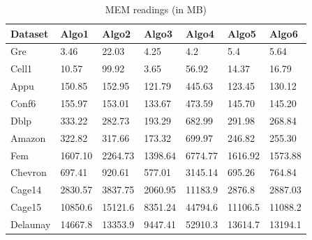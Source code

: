 

\begin{table}[th]
\begin{center}
    \begin{tabular}{| l | l | l | l | l | l | l |}
    \hline
	Dataset & Algo1 & Algo2 & Algo3 & Algo4 & Algo5 & Algo6\\ \hline
    \hline
	Gre & \cellcolor{blue!25}3.46 & 22.03 & 4.25 & 4.2 & 5.4 & 5.64 \\ \hline
	Cell1 & 10.57 & 99.92 & \cellcolor{blue!25}3.65 & 56.92 & 14.37 & 16.79\\ \hline
	Appu & 150.85 & 152.95 & \cellcolor{blue!25}121.79 & 445.63 & 123.45 & 130.12\\ \hline
	Conf6 & 155.97 & 153.01 & \cellcolor{blue!25}133.67 & 473.59 & 145.70 & 145.20\\ \hline
	Dblp & 333.22 & 282.73 & \cellcolor{blue!25}193.29 & 682.99 & 291.98 & 268.84\\ \hline
	Amazon & 322.82 & 317.66 & \cellcolor{blue!25}173.32 & 699.97 & 246.82 & 255.30\\ \hline
	Fem & 1607.10 & 2264.73 & \cellcolor{blue!25}1398.64 & 6774.77 & 1616.92 & 1573.88\\ \hline
	Chevron & 697.41 & 920.61 & \cellcolor{blue!25}577.01 & 3145.14 & 695.26 & 764.84\\ \hline
	Cage14 & 2830.57 & 3837.75 & \cellcolor{blue!25}2060.95 & 11183.9 & 2876.8 & 2887.03\\ \hline
	Cage15 & 10850.6 & 15121.6 & \cellcolor{blue!25}8351.24 & 44794.6 & 11106.5 & 11088.2\\ \hline
	Delaunay & 14667.8 & 13353.9 & \cellcolor{blue!25}9447.41 & 52910.3 & 13614.7 & 13194.1\\ \hline
    \end{tabular}
\end{center}
\caption{\capfont MEM readings (in MB)}
\label{tab:Table3}
\end{table}

